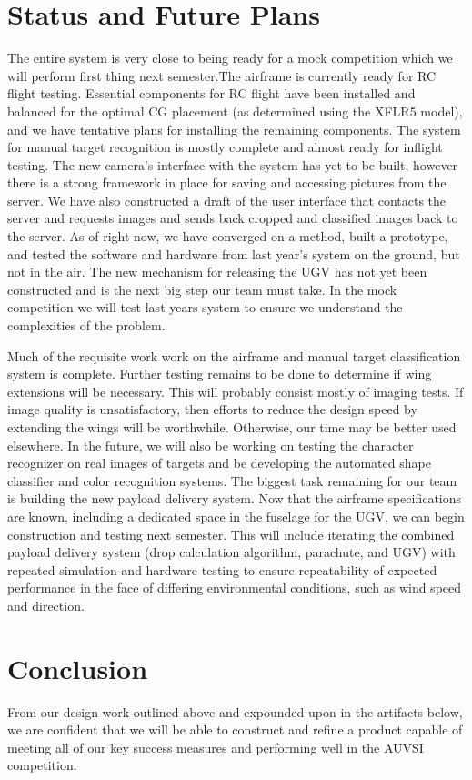 \documentclass{auvsi_doc}
\begin{document}
\section{Status and Future Plans}
The entire system is very close to being ready for a mock competition which we will perform first thing next semester.The airframe is currently ready for RC flight testing. Essential components for RC flight have been installed and balanced for the optimal CG placement (as determined using the XFLR5 model), and we have tentative plans for installing the remaining components. The system for manual target recognition is mostly complete and almost ready for inflight testing. The new camera's interface with the system has yet to be built, however there is a strong framework in place for saving and accessing pictures from the server. We have also constructed a draft of the user interface that contacts the server and requests images and sends back cropped and classified images back to the server. As of right now, we have converged on a method, built a prototype, and tested the software and hardware from last year's system on the ground, but not in the air. The new mechanism for releasing the UGV has not yet been constructed and is the next big step our team must take. In the mock competition we will test last years system to ensure we understand the complexities of the problem.

Much of the requisite work work on the airframe and manual target classification system is complete. Further testing remains to be done to determine if wing extensions will be necessary. This will probably consist mostly of imaging tests. If image quality is unsatisfactory, then efforts to reduce the design speed by extending the wings will be worthwhile. Otherwise, our time may be better used elsewhere. In the future, we will also be working on testing the character recognizer on real images of targets and be developing the automated shape classifier and color recognition systems. The biggest task remaining for our team is building the new payload delivery system. Now that the airframe specifications are known, including a dedicated space in the fuselage for the UGV, we can begin construction and testing next semester. This will include iterating the combined payload delivery system (drop calculation algorithm, parachute, and UGV) with repeated simulation and hardware testing to ensure repeatability of expected performance in the face of differing environmental conditions, such as wind speed and direction.

\section{Conclusion}
From our design work outlined above and expounded upon in the artifacts below, we are confident that we will be able to construct and refine a product capable of meeting all of our key success measures and performing well in the AUVSI competition.
\end{document}

